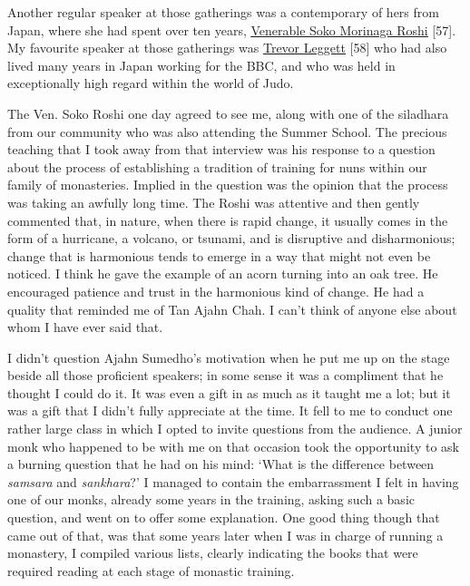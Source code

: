 Another regular speaker at those gatherings was a contemporary of hers
from Japan, where she had spent over ten years,
\href{https://en.wikipedia.org/wiki/Sōkō_Morinaga}{\underline{Venerable
Soko Morinaga Roshi}} {[}57{]}. My favourite speaker at those gatherings
was
\href{https://en.wikipedia.org/wiki/Trevor_Leggett}{\underline{Trevor
Leggett}} {[}58{]} who had also lived many years in Japan working for
the BBC, and who was held in exceptionally high regard within the world
of Judo.

The Ven. Soko Roshi one day agreed to see me, along with one of the
siladhara from our community who was also attending the Summer School.
The precious teaching that I took away from that interview was his
response to a question about the process of establishing a tradition of
training for nuns within our family of monasteries. Implied in the
question was the opinion that the process was taking an awfully long
time. The Roshi was attentive and then gently commented that, in nature,
when there is rapid change, it usually comes in the form of a hurricane,
a volcano, or tsunami, and is disruptive and disharmonious; change that
is harmonious tends to emerge in a way that might not even be noticed. I
think he gave the example of an acorn turning into an oak tree. He
encouraged patience and trust in the harmonious kind of change. He had a
quality that reminded me of Tan Ajahn Chah. I can't think of anyone else
about whom I have ever said that.

I didn't question Ajahn Sumedho's motivation when he put me up on the
stage beside all those proficient speakers; in some sense it was a
compliment that he thought I could do it. It was even a gift in as much
as it taught me a lot; but it was a gift that I didn't fully appreciate
at the time. It fell to me to conduct one rather large class in which I
opted to invite questions from the audience. A junior monk who happened
to be with me on that occasion took the opportunity to ask a burning
question that he had on his mind: `What is the difference between
\emph{samsara} and \emph{sankhara}?' I managed to contain the
embarrassment I felt in having one of our monks, already some years in
the training, asking such a basic question, and went on to offer some
explanation. One good thing though that came out of that, was that some
years later when I was in charge of running a monastery, I compiled
various lists, clearly indicating the books that were required reading
at each stage of monastic training.

